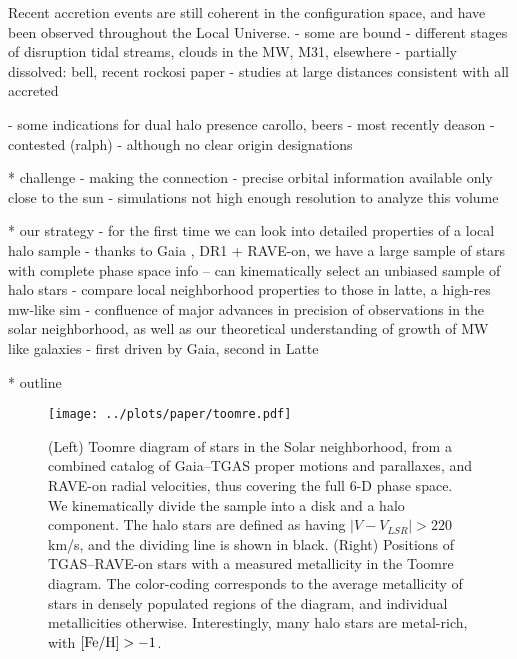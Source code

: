 \documentclass[apj, twocolappendix, numberedappendix, appendixfloats]{emulateapj}
\begin{document}
Recent accretion events are still coherent in the configuration space, and have been observed throughout the Local Universe. 
- some are bound \citep{sz}
- different stages of disruption tidal streams, clouds in the MW, M31, elsewhere
- partially dissolved: bell, recent rockosi paper
- studies at large distances consistent with all accreted

- some indications for dual halo presence carollo, beers
- most recently deason
- contested (ralph)
- although no clear origin designations

* challenge
- making the connection
- precise orbital information available only close to the sun
- simulations not high enough resolution to analyze this volume

* our strategy
- for the first time we can look into detailed properties of a local halo sample
- thanks to Gaia \citep{perryman2001}, DR1 + RAVE-on, we have a large sample of stars with complete phase space info -- can kinematically select an unbiased sample of halo stars
- compare local neighborhood properties to those in latte, a high-res mw-like sim
- confluence of major advances in precision of observations in the solar neighborhood, as well as our theoretical understanding of growth of MW like galaxies
- first driven by Gaia, second in Latte

* outline


\begin{figure*}
\begin{center}
\texttt{[image: ../plots/paper/toomre.pdf]}
\caption{(Left) Toomre diagram of stars in the Solar neighborhood, from a combined catalog of Gaia--TGAS proper motions and parallaxes, and RAVE-on radial velocities, thus covering the full 6-D phase space.
We kinematically divide the sample into a disk and a halo component.
The halo stars are defined as having $|V-V_{LSR}|>220$\,km/s, and the dividing line is shown in black.
(Right) Positions of TGAS--RAVE-on stars with a measured metallicity in the Toomre diagram.
The color-coding corresponds to the average metallicity of stars in densely populated regions of the diagram, and individual metallicities otherwise.
Interestingly, many halo stars are metal-rich, with $\rm[Fe/H]>-1$.}
\label{fig:toomre}
\end{center}
\end{figure*}
\end{document}
